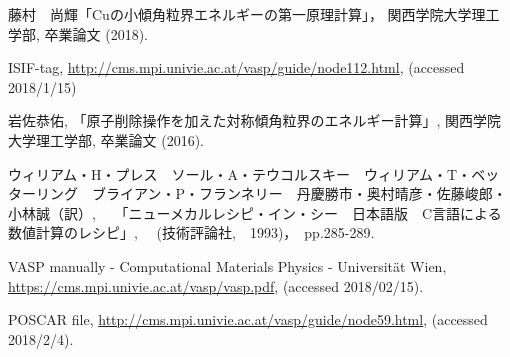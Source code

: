 
\begin{thebibliography}{9}
 藤村　尚輝「Cuの小傾角粒界エネルギーの第一原理計算」， 関西学院大学理工学部, 卒業論文 (2018).


 ISIF-tag, \url{http://cms.mpi.univie.ac.at/vasp/guide/node112.html}, (accessed 2018/1/15)

 岩佐恭佑, 
「原子削除操作を加えた対称傾角粒界のエネルギー計算」, 関西学院大学理工学部, 卒業論文 (2016).

ウィリアム・H・プレス　ソール・A・テウコルスキー　ウィリアム・T・ベッターリング　ブライアン・P・フランネリー　丹慶勝市・奥村晴彦・佐藤峻郎・小林誠（訳）,　
「ニューメカルレシピ・イン・シー　日本語版　C言語による数値計算のレシピ」, 　(技術評論社,　1993)，　pp.285-289.

VASP manually - Computational Materials Physics - Universit\"{a}t Wien, \url{https://cms.mpi.univie.ac.at/vasp/vasp.pdf}, (accessed 2018/02/15).

POSCAR file, \url{http://cms.mpi.univie.ac.at/vasp/guide/node59.html}, (accessed 2018/2/4).


    
    \end{thebibliography}

    
    
